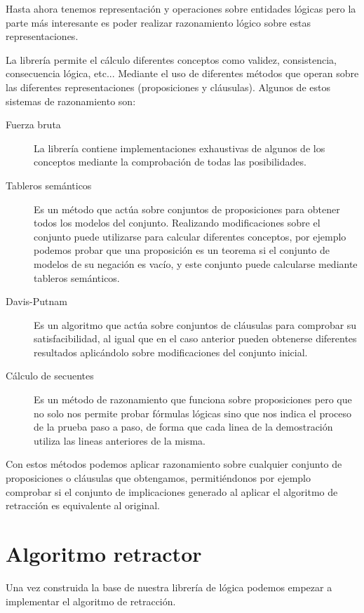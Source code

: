 	Hasta ahora tenemos representación y operaciones sobre entidades lógicas pero la parte más interesante es poder realizar razonamiento lógico sobre estas representaciones.	
	
	La librería permite el cálculo diferentes conceptos como validez, consistencia, consecuencia lógica, etc... Mediante el uso de diferentes métodos que operan sobre las diferentes representaciones (proposiciones y cláusulas). Algunos de estos sistemas de razonamiento son:
	
	\begin{description}
		\item[Fuerza bruta] La librería contiene implementaciones exhaustivas de algunos de los conceptos mediante la comprobación de todas las posibilidades.
		\item[Tableros semánticos] Es un método que actúa sobre conjuntos de proposiciones para obtener todos los modelos del conjunto. Realizando modificaciones sobre el conjunto puede utilizarse para calcular diferentes conceptos, por ejemplo podemos probar que una proposición es un teorema si el conjunto de modelos de su negación es vacío, y este conjunto puede calcularse mediante tableros semánticos.
		\item[Davis-Putnam] Es un algoritmo que actúa sobre conjuntos de cláusulas para comprobar su satisfacibilidad, al igual que en el caso anterior pueden obtenerse diferentes resultados aplicándolo sobre modificaciones del conjunto inicial.
		\item[Cálculo de secuentes] Es un método de razonamiento que funciona sobre proposiciones pero que no solo nos permite probar fórmulas lógicas sino que nos indica el proceso de la prueba paso a paso, de forma que cada linea de la demostración utiliza las lineas anteriores de la misma.
	\end{description}

	Con estos métodos podemos aplicar razonamiento sobre cualquier conjunto de proposiciones o cláusulas que obtengamos, permitiéndonos por ejemplo comprobar si el conjunto de implicaciones generado al aplicar el algoritmo de retracción es equivalente al original.
	
	
\section*{Algoritmo retractor}	
	
	Una vez construida la base de nuestra librería de lógica podemos empezar a implementar el algoritmo de retracción.
	

